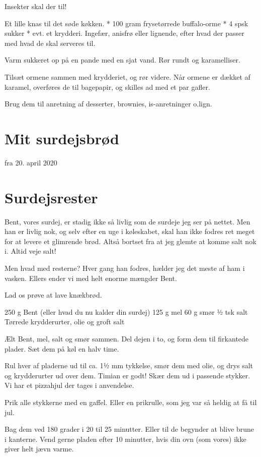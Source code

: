 \documentclass[
  letterpaper,
  DIV=11,
  numbers=noendperiod]{scrreprt}
\begin{document}
Insekter skal der til!

Et lille knas til det søde køkken. * 100 gram frysetørrede buffalo-orme
* 4 spsk sukker * evt. et krydderi. Ingefær, anisfrø eller lignende,
efter hvad der passer med hvad de skal serveres til.

Varm sukkeret op på en pande med en sjat vand. Rør rundt og
karamelliser.

Tilsæt ormene sammen med krydderiet, og rør videre. Når ormene er dækket
af karamel, overføres de til bagepapir, og skilles ad med et par gafler.

Brug dem til anretning af desserter, brownies, is-anretninger o.lign.

\hypertarget{mit-surdejsbruxf8d}{%
\section{Mit surdejsbrød}\label{mit-surdejsbruxf8d}}

fra 20. april 2020

\hypertarget{surdejsrester}{%
\section{Surdejsrester}\label{surdejsrester}}

Bent, vores surdej, er stadig ikke så livlig som de surdeje jeg ser på
nettet. Men han er livlig nok, og selv efter en uge i køleskabet, skal
han ikke fodres ret meget for at levere et glimrende brød. Altså bortset
fra at jeg glemte at komme salt nok i. Altid veje salt!

Men hvad med resterne? Hver gang han fodres, hælder jeg det meste af ham
i vasken. Ellers ender vi med helt enorme mængder Bent.

Lad os prøve at lave knækbrød.

250 g Bent (eller hvad du nu kalder din surdej) 125 g mel 60 g smør ½
tsk salt Tørrede krydderurter, olie og groft salt

Ælt Bent, mel, salt og smør sammen. Del dejen i to, og form dem til
firkantede plader. Sæt dem på køl en halv time.

Rul hver af pladerne ud til ca. 1½ mm tykkelse, smør dem med olie, og
drys salt og krydderurter ud over dem. Timian er godt! Skær dem ud i
passende stykker. Vi har et pizzahjul der tages i anvendelse.

Prik alle stykkerne med en gaffel. Eller en prikrulle, som jeg var så
heldig at få til jul.

Bag dem ved 180 grader i 20 til 25 minutter. Eller til de begynder at
blive brune i kanterne. Vend gerne pladen efter 10 minutter, hvis din
ovn (som vores) ikke giver helt jævn varme.
\end{document}

